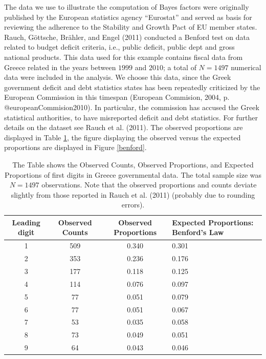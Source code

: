 \documentclass[
  english,
  man,floatsintext]{apa6}
\begin{document}
The data we use to illustrate the computation of Bayes factors were originally published by the European statistics agency ``Eurostat'' and served as basis for reviewing the adherence to the Stability and Growth Pact of EU member states. Rauch, Göttsche, Brähler, and Engel (2011) conducted a Benford test on data related to budget deficit criteria, i.e., public deficit, public dept and gross national products. This data used for this example contains fiscal data from Greece related in the years between \(1999\) and \(2010\); a total of \(N= 1497\) numerical data were included in the analysis. We choose this data, since the Greek government deficit and debt statistics states has been repeatedly criticized by the European Commission in this timespan (European Commision, 2004, p. @europeanCommision2010). In particular, the commission has accused the Greek statistical authorities, to have misreported deficit and debt statistics. For further details on the dataset see Rauch et al. (2011). The observed proportions are displayed in Table \ref{Tab:benford}, the figure displaying the observed versus the expected proportions are displayed in Figure \ref{benford}.

\begin{table}[h]
    \centering
    \caption{The Table shows the Observed Counts, Observed Proportions, and Expected Proportions of first digits in Greece governmental data. The total sample size was $N = 1497$ observations. Note that the observed proportions and counts deviate slightly from those reported in Rauch et al. (2011) (probably due to rounding errors).}
    \begin{tabular}{cccp{4cm}}
        \hline
Leading digit & Observed Counts & Observed Proportions & Expected Proportions: Benford's Law  \\
        \hline
        1 & 509 & 0.340 & 0.301  \\
        2 & 353 & 0.236 & 0.176  \\
        3 & 177 & 0.118 & 0.125  \\
        4 & 114 & 0.076 & 0.097  \\
        5 & 77 & 0.051 & 0.079  \\
        6 & 77 & 0.051 & 0.067  \\
        7 & 53 & 0.035 & 0.058  \\
        8 & 73 & 0.049 & 0.051  \\
        9 & 64 & 0.043 & 0.046  \\
        \hline
    \end{tabular}
    \label{Tab:benford}
\end{table}
\end{document}
